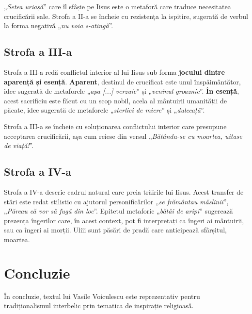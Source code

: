 \documentclass{article}
\newcommand{\qu}[1]{„\emph{#1}”}
\begin{document}
\qu{Setea uriașă} care îl sfâșie pe Iisus este o metaforă care traduce necesitatea crucificării sale. Strofa a II-a se încheie cu rezistența la ispitire, sugerată de verbul la forma negativă \qu{nu voia s-atingă}.

\subsection{Strofa a III-a}
Strofa a III-a redă conflictul interior al lui Iisus sub forma \textbf{jocului dintre aparență și esență}. \textbf{Aparent}, destinul de crucificat este unul înspăimântător, idee sugerată de metaforele \qu{apa [...] verzuie} și \qu{veninul groaznic}. \textbf{În esență}, acest sacrificiu este făcut cu un scop nobil, acela al mântuirii umanității de păcate, idee sugerată de metaforele \qu{sterlici de miere} și \qu{dulceață}.

Strofa a III-a se încheie cu soluționarea conflictului interior care presupune acceptarea crucificării, așa cum reiese din versul \qu{Bătându-se cu moartea, uitase de viață!}.

\subsection{Strofa a IV-a}
Strofa a IV-a descrie cadrul natural care preia trăirile lui Iisus. Acest transfer de stări este redat stilistic cu ajutorul personificărilor \qu{se frământau măslinii}, \qu{Păreau că vor să fugă din loc}. Epitetul metaforic \qu{bătăi de aripi} sugerează prezența îngerilor care, în acest context, pot fi interpretați ca îngeri ai mântuirii, sau ca îngeri ai morții. Uliii sunt păsări de pradă care anticipează sfârșitul, moartea.

\section{Concluzie}
În concluzie, textul lui Vasile Voiculescu este reprezentativ pentru tradiționalismul interbelic prin tematica de inspirație religioasă.
\end{document}
